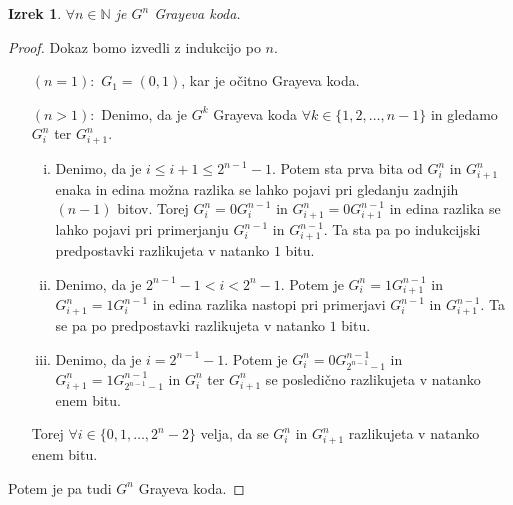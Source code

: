 \documentclass[a4paper, 10pt]{article}
\newtheorem{izr}{Izrek}
\newcommand{\mth}[1]{\ensuremath{\mathbb{#1}}}
\newcommand{\N}{\mth{N}}
\newcommand{\set}[1]{\ensuremath{\{1, 2, \ldots , #1\}}}
\newcommand{\seto}[1]{\ensuremath{\{0, 1, \ldots , #1\}}}
\begin{document}
	\begin{izr}
		$\forall n\in\N$ je $G^n$ Grayeva koda.
	\end{izr}
	\begin{proof}
		Dokaz bomo izvedli z indukcijo po $n$. \begin{itemize}
			\item[$(n = 1):$] $G_1 = (0, 1)$, kar je očitno Grayeva koda.
			\item[$(n > 1):$] Denimo, da je $G^k$ Grayeva koda $\forall k\in \set{n-1}$ in gledamo $G^n_{i}$ ter $G^n_{i+1}$. \begin{enumerate}[i)]
				\item Denimo, da je $i \leq i+1 \leq 2^{n-1}-1$. Potem sta prva bita od $G^n_{i}$ in $G^n_{i+1}$ enaka in edina možna razlika se lahko pojavi pri gledanju zadnjih $(n-1)$ bitov. Torej $G^n_{i} = 0G^{n-1}_i$ in $G^n_{i+1} = 0G^{n-1}_{i+1}$ in edina razlika se lahko pojavi pri primerjanju $G^{n-1}_{i}$ in $G^{n-1}_{i+1}$. Ta sta pa po indukcijski predpostavki razlikujeta v natanko $1$ bitu.
				\item Denimo, da je $2^{n-1}-1 < i < 2^n - 1$. Potem je $G^n_{i} = 1G^{n-1}_{i+1}$ in $G^n_{i+1} = 1G^{n-1}_{i}$ in edina razlika nastopi pri primerjavi $G^{n-1}_i$ in $G^{n-1}_{i+1}$. Ta se pa po predpostavki razlikujeta v natanko $1$ bitu.
				\item Denimo, da je $i = 2^{n-1}-1$. Potem je $G^n_{i} = 0G^{n-1}_{2^{n-1}-1}$ in $G^n_{i+1} = 1G^{n-1}_{2^{n-1}-1}$ in $G^n_{i}$ ter $G^n_{i+1}$ se posledično razlikujeta v natanko enem bitu.
			\end{enumerate}
			Torej $\forall i \in \seto{2^{n}-2}$ velja, da se $G^n_i$ in $G^n_{i+1}$ razlikujeta v natanko enem bitu.
		\end{itemize}
		Potem je pa tudi $G^n$ Grayeva koda.
	\end{proof}
\end{document}
